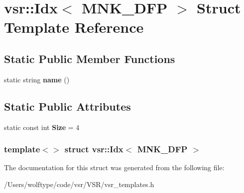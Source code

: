 \hypertarget{structvsr_1_1_idx_3_01_m_n_k___d_f_p_01_4}{\section{vsr\-:\-:Idx$<$ M\-N\-K\-\_\-\-D\-F\-P $>$ Struct Template Reference}
\label{structvsr_1_1_idx_3_01_m_n_k___d_f_p_01_4}
}
\subsection*{Static Public Member Functions}
\begin{DoxyCompactItemize}
\item 
\hypertarget{structvsr_1_1_idx_3_01_m_n_k___d_f_p_01_4_a7a8b6650100f85997da4215dc7f8b87f}{static string {\bfseries name} ()}\label{structvsr_1_1_idx_3_01_m_n_k___d_f_p_01_4_a7a8b6650100f85997da4215dc7f8b87f}

\end{DoxyCompactItemize}
\subsection*{Static Public Attributes}
\begin{DoxyCompactItemize}
\item 
\hypertarget{structvsr_1_1_idx_3_01_m_n_k___d_f_p_01_4_a3ea08c04283f37a8c2ee6cb652fdd8da}{static const int {\bfseries Size} = 4}\label{structvsr_1_1_idx_3_01_m_n_k___d_f_p_01_4_a3ea08c04283f37a8c2ee6cb652fdd8da}

\end{DoxyCompactItemize}
\subsubsection*{template$<$$>$ struct vsr\-::\-Idx$<$ M\-N\-K\-\_\-\-D\-F\-P $>$}



The documentation for this struct was generated from the following file\-:\begin{DoxyCompactItemize}
\item 
/\-Users/wolftype/code/vsr/\-V\-S\-R/vsr\-\_\-templates.\-h\end{DoxyCompactItemize}
